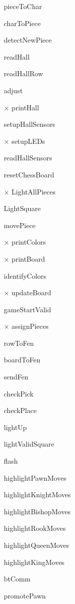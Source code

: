 \documentclass[12pt, titlepage]{article}
\begin{document}
\begin{itemize}
  \item[\checkmark] pieceToChar
  \item[\checkmark] charToPiece
  \item[\checkmark] detectNewPiece
  \item[\checkmark] readHall
  \item[\checkmark] readHallRow
  \item[\checkmark] adjust
  \item[$\times$] printHall
  \item[\checkmark] setupHallSensors
  \item[$\times$] setupLEDs
  \item[\checkmark] readHallSensors
  \item[\checkmark] resetChessBoard
  \item[$\times$] LightAllPieces
  \item[\checkmark] LightSquare
  \item[\checkmark] movePiece
  \item[$\times$] printColors
  \item[$\times$] printBoard
  \item[\checkmark] identifyColors
  \item[$\times$] updateBoard
  \item[\checkmark] gameStartValid
  \item[$\times$] assignPieces
  \item[\checkmark] rowToFen
  \item[\checkmark] boardToFen
  \item[\checkmark] sendFen
  \item[\checkmark] checkPick
  \item[\checkmark] checkPlace
  \item[\checkmark] lightUp
  \item[\checkmark] lightValidSquare
  \item[\checkmark] flash
  \item[\checkmark] highlightPawnMoves
  \item[\checkmark] highlightKnightMoves
  \item[\checkmark] highlightBishopMoves
  \item[\checkmark] highlightRookMoves
  \item[\checkmark] highlightQueenMoves
  \item[\checkmark] highlightKingMoves
  \item[\checkmark] btComm
  \item[\checkmark] promotePawn

\end{itemize}
\end{document}
